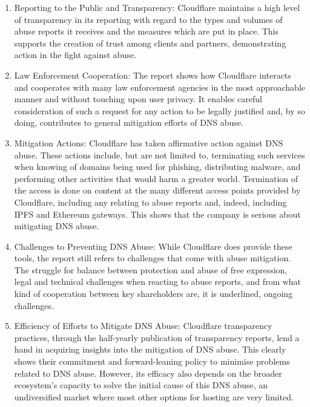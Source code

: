 \begin{enumerate}
\begin{enumerate}

\item Reporting to the Public and Transparency: Cloudflare maintains a high level of transparency in its reporting with regard to the types and volumes of abuse reports it receives and the measures which are put in place. This supports the creation of trust among clients and partners, demonstrating action in the fight against abuse.

\item Law Enforcement Cooperation: The report shows how Cloudflare interacts and cooperates with many law enforcement agencies in the most approachable manner and without touching upon user privacy. It enables careful consideration of such a request for any action to be legally justified and, by so doing, contributes to general mitigation efforts of DNS abuse.

\item Mitigation Actions: Cloudflare has taken affirmative action against DNS abuse. These actions include, but are not limited to, terminating such services when knowing of domains being used for phishing, distributing malware, and performing other activities that would harm a greater world. Termination of the access is done on content at the many different access points provided by Cloudflare, including any relating to abuse reports and, indeed, including IPFS and Ethereum gateways. This shows that the company is serious about mitigating DNS abuse.

\item Challenges to Preventing DNS Abuse: While Cloudflare does provide these tools, the report still refers to challenges that come with abuse mitigation. The struggle for balance between protection and abuse of free expression, legal and technical challenges when reacting to abuse reports, and from what kind of cooperation between key shareholders are, it is underlined, ongoing challenges.

\item Efficiency of Efforts to Mitigate DNS Abuse: Cloudflare transparency practices, through the half-yearly publication of transparency reports, lend a hand in acquiring insights into the mitigation of DNS abuse. This clearly shows their commitment and forward-leaning policy to minimise problems related to DNS abuse. However, its efficacy also depends on the broader ecosystem's capacity to solve the initial cause of this DNS abuse, an undiversified market where most other options for hosting are very limited.


\end{enumerate}
\end{enumerate}
